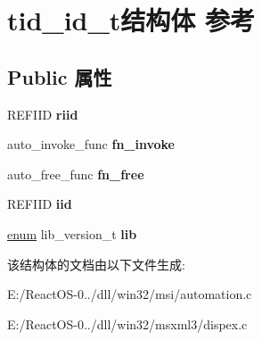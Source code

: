 \hypertarget{structtid__id__t}{}\section{tid\+\_\+id\+\_\+t结构体 参考}
\label{structtid__id__t}
\subsection*{Public 属性}
\begin{DoxyCompactItemize}
\item 
\mbox{\label{structtid__id__t_a28c124432a35e79273466a0aae6face7}} 
R\+E\+F\+I\+ID {\bfseries riid}
\item 
\mbox{\label{structtid__id__t_a5fec85a96182eacd097036a0c6d676db}} 
auto\+\_\+invoke\+\_\+func {\bfseries fn\+\_\+invoke}
\item 
\mbox{\label{structtid__id__t_acf3a73473f41474c877cdaf4c66c43f5}} 
auto\+\_\+free\+\_\+func {\bfseries fn\+\_\+free}
\item 
\mbox{\label{structtid__id__t_a973415e0105e47afa7b5bf40ccb32297}} 
R\+E\+F\+I\+ID {\bfseries iid}
\item 
\mbox{\label{structtid__id__t_ab2732bfbe3b7f63e8658e02020ddcdae}} 
\hyperlink{interfaceenum}{enum} lib\+\_\+version\+\_\+t {\bfseries lib}
\end{DoxyCompactItemize}


该结构体的文档由以下文件生成\+:\begin{DoxyCompactItemize}
\item 
E\+:/\+React\+O\+S-\/0../dll/win32/msi/automation.\+c\item 
E\+:/\+React\+O\+S-\/0../dll/win32/msxml3/dispex.\+c\end{DoxyCompactItemize}
